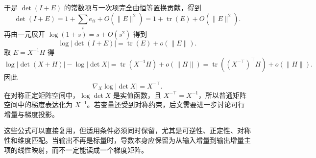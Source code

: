 于是 $\det(I+E)$ 的常数项与一次项完全由恒等置换贡献，得到
\[
\det(I+E)=1+\sum_i e_{ii}+O(\|E\|^2)=1+\operatorname{tr}(E)+O(\|E\|^2).
\]
再由一元展开 \(\log(1+s)=s+O(s^2)\) 得到
\[
\log|\det(I+E)|=\operatorname{tr}(E)+o(\|E\|).
\]
取 \(E=X^{-1}H\) 得
\[
\log|\det(X+H)|-\log|\det X|
=\operatorname{tr}(X^{-1}H)+o(\|H\|)
=\operatorname{tr}((X^{-\top})^\top H)+o(\|H\|).
\]
因此
\[
\nabla_X \log|\det X|=X^{-\top}.
\]
在对称正定矩阵空间中，\(\log\det X\) 是实值函数，且 \(X^{-\top}=X^{-1}\)，所以普通矩阵空间中的梯度表达化为 \(X^{-1}\)。若变量还受到对称约束，后文需要进一步讨论可行增量与梯度投影。

这些公式可以直接复用，但适用条件必须同时保留，尤其是可逆性、正定性、对称性和维度匹配。当输出不再是标量时，导数本身应保留为从输入增量到输出增量主项的线性映射，而不一定能读成一个梯度矩阵。
